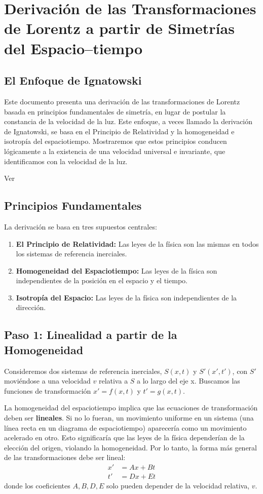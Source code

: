 \documentclass[11pt,a4paper]{article}
\begin{document}
\section{Derivación de las Transformaciones de Lorentz a partir de Simetrías del Espacio--tiempo}
\label{sec:tl}
\subsection{El Enfoque de Ignatowski}
Este documento presenta una derivación de las transformaciones de Lorentz basada en principios fundamentales de simetría, en lugar de postular la constancia de la velocidad de la luz. Este enfoque, a veces llamado la derivación de Ignatowski, se basa en el Principio de Relatividad y la homogeneidad e isotropía del espaciotiempo. Mostraremos que estos principios conducen lógicamente a la existencia de una velocidad universal e invariante, que identificamos con la velocidad de la luz.

Ver \cite{Datta:2022cpw} %


\subsection{Principios Fundamentales}
La derivación se basa en tres supuestos centrales:
\begin{enumerate}
    \item \textbf{El Principio de Relatividad:} Las leyes de la física son las mismas en todos los sistemas de referencia inerciales.
    \item \textbf{Homogeneidad del Espaciotiempo:} Las leyes de la física son independientes de la posición en el espacio y el tiempo.
    \item \textbf{Isotropía del Espacio:} Las leyes de la física son independientes de la dirección.
\end{enumerate}


\subsection{Paso 1: Linealidad a partir de la Homogeneidad}
Consideremos dos sistemas de referencia inerciales, $S(x,t)$ y $S'(x',t')$, con $S'$ moviéndose a una velocidad $v$ relativa a $S$ a lo largo del eje x. Buscamos las funciones de transformación $x' = f(x,t)$ y $t' = g(x,t)$.

La homogeneidad del espaciotiempo implica que las ecuaciones de transformación deben ser \textbf{lineales}. Si no lo fueran, un movimiento uniforme en un sistema (una línea recta en un diagrama de espaciotiempo) aparecería como un movimiento acelerado en otro. Esto significaría que las leyes de la física dependerían de la elección del origen, violando la homogeneidad. Por lo tanto, la forma más general de las transformaciones debe ser lineal:
\begin{align*}
x' &= Ax + Bt \\
t' &= Dx + Et
\end{align*}
donde los coeficientes $A, B, D, E$ solo pueden depender de la velocidad relativa, $v$.
\end{document}
